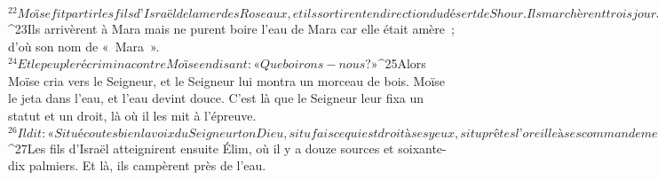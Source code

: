   
  
${}^{22}Moïse fit partir les fils d’Israël de la mer des Roseaux, et ils sortirent en direction du désert de Shour. Ils marchèrent trois jours à travers le désert sans trouver d’eau. 
${}^{23}Ils arrivèrent à Mara mais ne purent boire l’eau de Mara car elle était amère ; d’où son nom de « Mara ». 
${}^{24}Et le peuple récrimina contre Moïse en disant : « Que boirons-nous ? » 
${}^{25}Alors Moïse cria vers le Seigneur, et le Seigneur lui montra un morceau de bois. Moïse le jeta dans l’eau, et l’eau devint douce. C’est là que le Seigneur leur fixa un statut et un droit, là où il les mit à l’épreuve.
${}^{26}Il dit : « Si tu écoutes bien la voix du Seigneur ton Dieu, si tu fais ce qui est droit à ses yeux, si tu prêtes l’oreille à ses commandements, si tu observes tous ses décrets, je ne t’infligerai aucune des maladies que j’ai infligées aux Égyptiens, car je suis le Seigneur, celui qui te guérit. »
${}^{27}Les fils d’Israël atteignirent ensuite Élim, où il y a douze sources et soixante-dix palmiers. Et là, ils campèrent près de l’eau.
      
